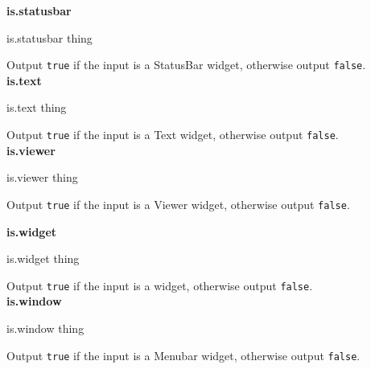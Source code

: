 {\bf is.statusbar} 
\begin{verbatimtab}
is.statusbar thing
\end{verbatimtab}
Output {\tt true} if the input is a StatusBar widget, otherwise output {\tt false}.\\

{\bf is.text} 
\begin{verbatimtab}
is.text thing
\end{verbatimtab}
Output {\tt true} if the input is a Text widget, otherwise output {\tt false}.\\

\cbstart
{\bf is.viewer} 
\begin{verbatimtab}
is.viewer thing
\end{verbatimtab}
Output {\tt true} if the input is a Viewer widget, otherwise output {\tt false}.\\
\cbend

{\bf is.widget} 
\begin{verbatimtab}
is.widget thing
\end{verbatimtab}
Output {\tt true} if the input is a widget, otherwise output {\tt false}.\\

{\bf is.window} 
\begin{verbatimtab}
is.window thing
\end{verbatimtab}
Output {\tt true} if the input is a Menubar widget, otherwise output {\tt false}.
